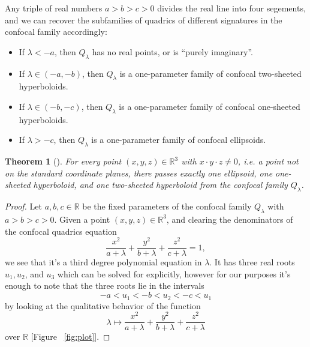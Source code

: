 \documentclass[10pt, a4paper]{article}
\theoremstyle{BoldTopSpacing}
\newtheorem{theorem}{Theorem}[section]
\theoremstyle{BoldTopSpacing}
\theoremstyle{BoldTopSpacing}
\theoremstyle{BoldTopBottomSpacing}
\theoremstyle{BoldTopSpacing}
\theoremstyle{BoldTopBottomSpacing}
\theoremstyle{remark}
\begin{document}
Any triple of real numbers $a > b > c > 0$ divides the real line into four segements, and we can recover the subfamilies of quadrics of different signatures in the confocal family accordingly:

\begin{itemize}[label=$\blacktriangleright$]
    \item If $\lambda < -a$, then $Q_{\lambda}$ has no real points, or is \enquote{purely imaginary}.
    \item If $\lambda \in (-a, -b)$, then $Q_{\lambda}$ is a one-parameter family of confocal two-sheeted hyperboloids.
    \item If $\lambda \in (-b, -c)$, then $Q_{\lambda}$ is a one-parameter family of confocal one-sheeted hyperboloids.
    \item If $\lambda > -c$, then $Q_{\lambda}$ is a one-parameter family of confocal ellipsoids. \par
\end{itemize}

\begin{theorem}[]
\label{thm:fill-up-euclidean-space}
For every point $(x, y, z) \in \mathbb{R}^3$ with $x \cdot y \cdot z \neq 0$, i.e. a point not on the standard coordinate planes, there passes exactly one ellipsoid, one one-sheeted hyperboloid, and one two-sheeted hyperboloid from the confocal family $Q_{\lambda}$.
\end{theorem}

\begin{proof}
    Let $a, b, c \in \mathbb{R}$ be the fixed parameters of the confocal family $Q_{\lambda}$ with $a > b > c > 0$. Given a point $(x, y, z) \in \mathbb{R}^3$, and clearing the denominators of the confocal quadrics equation
\[
    \frac{x^2}{a + \lambda} + \frac{y^2}{b + \lambda} + \frac{z^2}{c + \lambda} = 1,
\]
we see that it's a third degree polynomial equation in $\lambda$. It has three real roots $u_{1}, u_{2}$, and $u_{3}$ which can be solved for explicitly, however for our purposes it's enough to note that the three roots lie in the intervals
\[
    -a < u_{1} < -b < u_{2} < -c < u_{1}
\]
by looking at the qualitative behavior of the function
\[
    \lambda \mapsto \frac{x^2}{a + \lambda} + \frac{y^2}{b + \lambda} + \frac{z^2}{c + \lambda}
\]
over $\mathbb{R}$ [Figure ~\ref{fig:plot}].
\end{proof}
\end{document}
